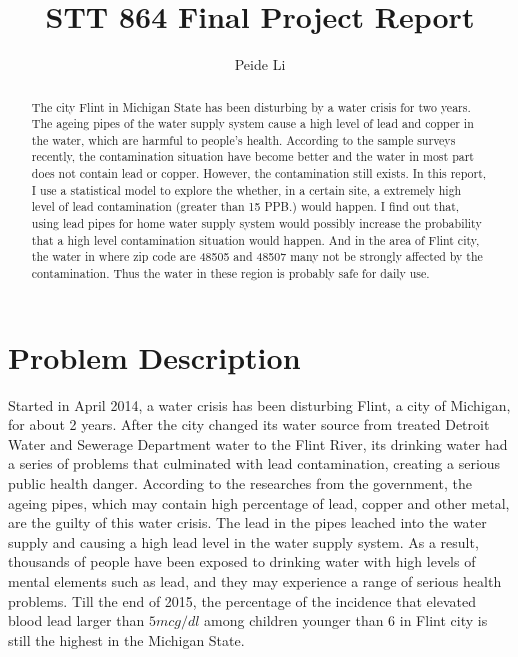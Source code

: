 \documentclass[letterpaper,12pt]{article}
\title{STT 864 \quad Final Project Report}
\author{Peide Li}
\date{}
\newcommand{\sihao}{\fontsize{14pt}{\baselineskip}\selectfont}       %
\begin{document}
\maketitle

\renewcommand{\abstractname}{Summary}

\begin{abstract}
The city Flint in Michigan State has been disturbing by a water crisis for two years. The ageing pipes of the water supply system cause a high level of lead and copper in the water, which are harmful to people's health. According to the sample surveys recently, the contamination situation have become better and the water in most part does not contain lead or copper. However, the contamination still exists. In this report, I use a statistical model to explore the whether, in a certain site, a extremely high level of lead contamination (greater than 15 PPB.) would happen. I find out that, using lead pipes for home water supply system would possibly increase the probability that a high level contamination situation would happen. And in the area of Flint city, the water in where zip code are 48505 and 48507 many not be strongly affected by the contamination. Thus the water in these region is probably safe for daily use.
\end{abstract}

\section*{\sihao Problem Description}
Started in April 2014, a water crisis has been disturbing Flint, a city of Michigan, for about 2 years. After the city changed its water source from treated Detroit Water and Sewerage Department water to the Flint River, its drinking water had a series of problems that culminated with lead contamination, creating a serious public health danger. According to the researches from the government, the ageing pipes, which may contain high percentage of lead, copper and other metal, are the guilty of this water crisis. The lead in the pipes leached into the water supply and causing a high lead level in the water supply system. As a result, thousands of people have been exposed to drinking water with high levels of mental elements such as lead, and they may experience a range of serious health problems. Till the end of 2015, the percentage of the incidence that elevated blood lead larger than $5mcg/dl$ among children younger than 6 in Flint city is still the highest in the Michigan State.  
\end{document}
